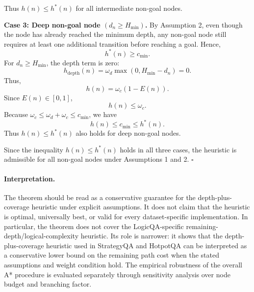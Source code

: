\documentclass{article}
\begin{document}
Thus \(h(n)\leq h^*(n)\) for all intermediate non-goal nodes.

\textbf{Case 3: Deep non-goal node \((d_n\geq H_{\min})\).}
By Assumption 2, even though the node has already reached the minimum depth, any non-goal node still requires at least one additional transition before reaching a goal. Hence,
\[
h^*(n)\geq c_{\min}.
\]
For \(d_n\geq H_{\min}\), the depth term is zero:
\[
h_{\mathrm{depth}}(n)=\omega_d\max(0,H_{\min}-d_n)=0.
\]
Thus,
\[
h(n)=\omega_c(1-E(n)).
\]
Since \(E(n)\in[0,1]\),
\[
h(n)\leq \omega_c.
\]
Because \(\omega_c\leq \omega_d+\omega_c\leq c_{\min}\), we have
\[
h(n)\leq c_{\min}\leq h^*(n).
\]
Thus \(h(n)\leq h^*(n)\) also holds for deep non-goal nodes.

Since the inequality \(h(n)\leq h^*(n)\) holds in all three cases, the heuristic is admissible for all non-goal nodes under Assumptions 1 and 2.
\(\square\)

\paragraph{Interpretation.}
The theorem should be read as a conservative guarantee for the depth-plus-coverage heuristic under explicit assumptions. It does not claim that the heuristic is optimal, universally best, or valid for every dataset-specific implementation. In particular, the theorem does not cover the LogicQA-specific remaining-depth/logical-complexity heuristic. Its role is narrower: it shows that the depth-plus-coverage heuristic used in StrategyQA and HotpotQA can be interpreted as a conservative lower bound on the remaining path cost when the stated assumptions and weight condition hold. The empirical robustness of the overall A* procedure is evaluated separately through sensitivity analysis over node budget and branching factor.



\end{document}
